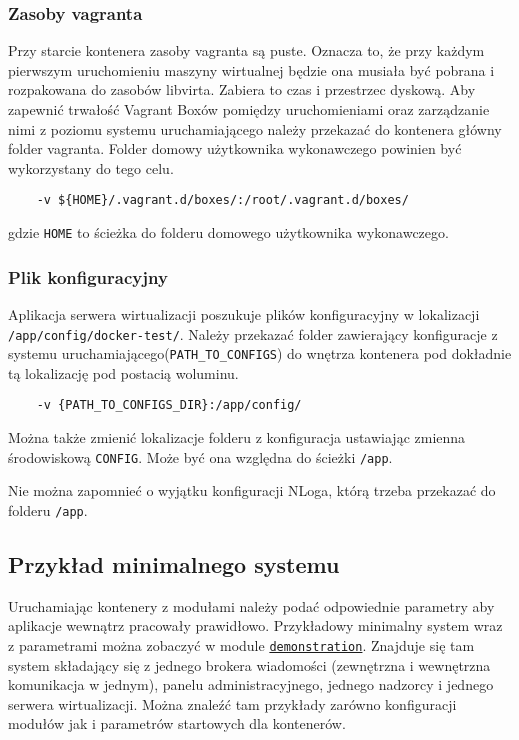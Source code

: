 \documentclass[../opis-rozwiazania.tex]{subfiles}
\begin{document}
\subsubsection{Zasoby vagranta}
Przy starcie kontenera zasoby vagranta są puste.
Oznacza to, że przy każdym pierwszym uruchomieniu maszyny wirtualnej będzie ona musiała być pobrana i rozpakowana do zasobów libvirta.
Zabiera to czas i przestrzec dyskową.
Aby zapewnić trwałość Vagrant Boxów pomiędzy uruchomieniami oraz zarządzanie nimi z poziomu systemu uruchamiającego należy przekazać do kontenera główny folder vagranta.
Folder domowy użytkownika wykonawczego powinien być wykorzystany do tego celu.

\begin{verbatim}
	-v ${HOME}/.vagrant.d/boxes/:/root/.vagrant.d/boxes/
\end{verbatim}
gdzie \texttt{HOME} to ścieżka do folderu domowego użytkownika wykonawczego.

\subsubsection{Plik konfiguracyjny}
Aplikacja serwera wirtualizacji poszukuje plików konfiguracyjny w lokalizacji \texttt{/app/config/docker-test/}.
Należy przekazać folder zawierający konfiguracje z systemu uruchamiającego(\texttt{PATH\_TO\_CONFIGS}) do wnętrza kontenera pod dokładnie tą lokalizację pod postacią woluminu.
\begin{verbatim}
	-v {PATH_TO_CONFIGS_DIR}:/app/config/
\end{verbatim}

Można także zmienić lokalizacje folderu z konfiguracja ustawiając zmienna środowiskową \texttt{CONFIG}.
Może być ona względna do ścieżki \texttt{/app}.

Nie można zapomnieć o wyjątku konfiguracji NLoga, którą trzeba przekazać do folderu \texttt{/app}.

\subsection{Przykład minimalnego systemu}
Uruchamiając kontenery z modułami należy podać odpowiednie parametry aby aplikacje wewnątrz pracowały prawidłowo.
Przykładowy minimalny system wraz z parametrami można zobaczyć w module \href{https://github.com/one-click-desktop/demonstration}{\texttt{demonstration}}.
Znajduje się tam system składający się z jednego brokera wiadomości (zewnętrzna i wewnętrzna komunikacja w jednym), panelu administracyjnego, jednego nadzorcy i jednego serwera wirtualizacji.
Można znaleźć tam przykłady zarówno konfiguracji modułów jak i parametrów startowych dla kontenerów.
\end{document}
